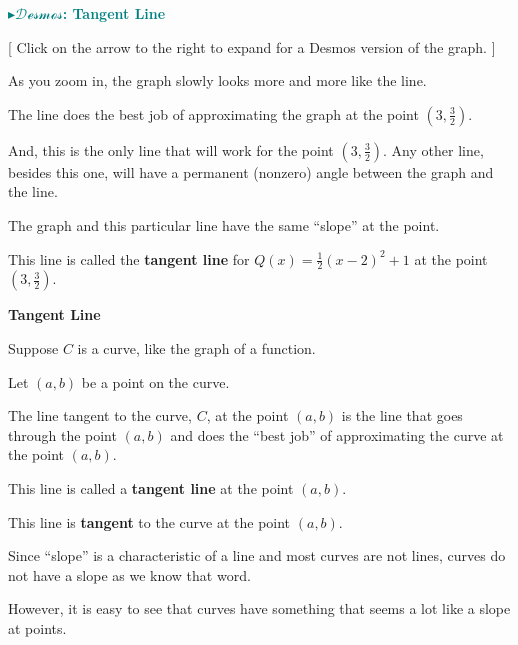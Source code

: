 \documentclass{ximera}
\begin{document}
\begin{onlineOnly}
\textbf{\textcolor{teal}{$\blacktriangleright \mathcal{Desmos}$: Tangent Line}} 
\begin{expandable} 
\begin{center}
\end{center}
\end{expandable}
\end{onlineOnly}
[ Click on the arrow to the right to expand for a Desmos version of the graph. ]






As you zoom in, the graph slowly looks more and more like the line. 


The line does the best job of approximating the graph at the point $\left( 3, \frac{3}{2} \right)$. 


And, this is the only line that will work for the point $\left( 3, \frac{3}{2} \right)$.  Any other line, besides this one, will have a permanent (nonzero) angle between the graph and the line.  

The graph and this particular line have the same ``slope'' at the point. 


This line is called the \textbf{\textcolor{blue!55!black}{tangent line}} for $Q(x) = \frac{1}{2} (x - 2)^2 + 1$ at the point $\left( 3, \frac{3}{2} \right)$.




\begin{definition} \textbf{\textcolor{green!50!black}{Tangent Line}}


Suppose $C$ is a curve, like the graph of a function. 

Let $(a, b)$ be a point on the curve.

The line tangent to the curve, $C$, at the point $(a, b)$ is the line that goes through the point $(a, b)$ and does the ``best job'' of approximating the curve at the point $(a, b)$.

This line is called a \textbf{tangent line} at the point $(a, b)$.

This line is \textbf{tangent} to the curve at the point $(a, b)$.


\end{definition}


Since ``slope'' is a characteristic of a line and most curves are not lines, curves do not have a slope as we know that word. 

However, it is easy to see that curves have something that seems a lot like a slope at points. 
\end{document}
